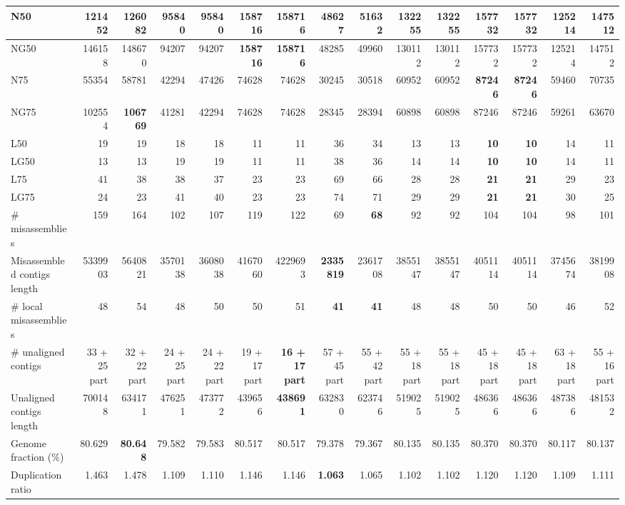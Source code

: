 \documentclass[12pt,a4paper]{article}
\begin{document}
\begin{table}[ht]
\begin{center}
\begin{tabular}{|l*{14}{|r}|}
N50 & 121452 & 126082 & 95840 & 95840 & {\bf 158716} & {\bf 158716} & 48627 & 51632 & 132255 & 132255 & 157732 & 157732 & 125214 & 147512 \\ \hline
NG50 & 146158 & 148670 & 94207 & 94207 & {\bf 158716} & {\bf 158716} & 48285 & 49960 & 130112 & 130112 & 157732 & 157732 & 125214 & 147512 \\ \hline
N75 & 55354 & 58781 & 42294 & 47426 & 74628 & 74628 & 30245 & 30518 & 60952 & 60952 & {\bf 87246} & {\bf 87246} & 59460 & 70735 \\ \hline
NG75 & 102554 & {\bf 106769} & 41281 & 42294 & 74628 & 74628 & 28345 & 28394 & 60898 & 60898 & 87246 & 87246 & 59261 & 63670 \\ \hline
L50 & 19 & 19 & 18 & 18 & 11 & 11 & 36 & 34 & 13 & 13 & {\bf 10} & {\bf 10} & 14 & 11 \\ \hline
LG50 & 13 & 13 & 19 & 19 & 11 & 11 & 38 & 36 & 14 & 14 & {\bf 10} & {\bf 10} & 14 & 11 \\ \hline
L75 & 41 & 38 & 38 & 37 & 23 & 23 & 69 & 66 & 28 & 28 & {\bf 21} & {\bf 21} & 29 & 23 \\ \hline
LG75 & 24 & 23 & 41 & 40 & 23 & 23 & 74 & 71 & 29 & 29 & {\bf 21} & {\bf 21} & 30 & 25 \\ \hline
\# misassemblies & 159 & 164 & 102 & 107 & 119 & 122 & 69 & {\bf 68} & 92 & 92 & 104 & 104 & 98 & 101 \\ \hline
Misassembled contigs length & 5339903 & 5640821 & 3570138 & 3608038 & 4167060 & 4229693 & {\bf 2335819} & 2361708 & 3855147 & 3855147 & 4051114 & 4051114 & 3745674 & 3819908 \\ \hline
\# local misassemblies & 48 & 54 & 48 & 50 & 50 & 51 & {\bf 41} & {\bf 41} & 48 & 48 & 50 & 50 & 46 & 52 \\ \hline
\# unaligned contigs & 33 + 25 part & 32 + 22 part & 24 + 25 part & 24 + 22 part & 19 + 17 part & {\bf 16 + 17 part} & 57 + 45 part & 55 + 42 part & 55 + 18 part & 55 + 18 part & 45 + 18 part & 45 + 18 part & 63 + 18 part & 55 + 16 part \\ \hline
Unaligned contigs length & 700148 & 634171 & 476251 & 473772 & 439656 & {\bf 438691} & 632830 & 623746 & 519025 & 519025 & 486366 & 486366 & 487386 & 481532 \\ \hline
Genome fraction (\%) & 80.629 & {\bf 80.648} & 79.582 & 79.583 & 80.517 & 80.517 & 79.378 & 79.367 & 80.135 & 80.135 & 80.370 & 80.370 & 80.117 & 80.137 \\ \hline
Duplication ratio & 1.463 & 1.478 & 1.109 & 1.110 & 1.146 & 1.146 & {\bf 1.063} & 1.065 & 1.102 & 1.102 & 1.120 & 1.120 & 1.109 & 1.111 \\ \hline

\end{tabular}
\end{center}
\end{table}
\end{document}
